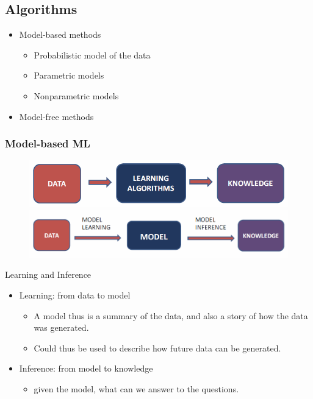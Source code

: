\documentclass[letterpaper,10pt]{article}
\begin{document}
\subsection{Algorithms}

\begin{itemize}
	\item Model-based methods
	\begin{itemize}
		\item Probabilistic model of the data
		\item Parametric models
		\item Nonparametric models
	\end{itemize}
	\item Model-free methods
\end{itemize}

\subsubsection{Model-based ML}

\begin{figure}[!h]
	\centering
	\includegraphics[width=15cm]{./img/machinelearning.png}\\
	\includegraphics[width=15cm]{./img/modelbasedml.png}
\end{figure}

Learning and Inference
\begin{itemize}
	\item Learning: from data to model
	\begin{itemize}
		\item A model thus is a summary of the data, and also a story of how the data was generated.
		\item Could thus be used to describe how future data can be generated.
	\end{itemize}
	\item Inference: from model to knowledge
	\begin{itemize}
		\item given the model, what can we answer to the questions.
	\end{itemize}
\end{itemize}
\end{document}
